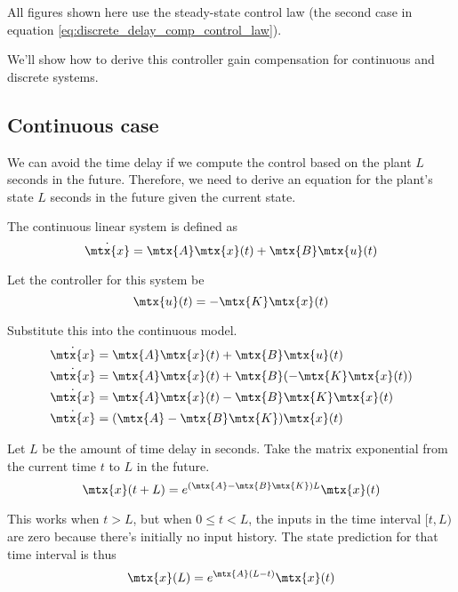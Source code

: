 All figures shown here use the steady-state control law (the second case in
equation \eqref{eq:discrete_delay_comp_control_law}).

We'll show how to derive this controller gain compensation for continuous and
discrete systems.

\subsection{Continuous case}

We can avoid the time delay if we compute the control based on the plant $L$
seconds in the future. Therefore, we need to derive an equation for the plant's
state $L$ seconds in the future given the current state.

The continuous linear system is defined as
\begin{equation*}
  \dot{\mtx{x}} = \mtx{A}\mtx{x}(t) + \mtx{B}\mtx{u}(t)
\end{equation*}

Let the controller for this system be
\begin{equation*}
  \mtx{u}(t) = -\mtx{K}\mtx{x}(t)
\end{equation*}

Substitute this into the continuous model.
\begin{align*}
  \dot{\mtx{x}} &= \mtx{A}\mtx{x}(t) + \mtx{B}\mtx{u}(t) \\
  \dot{\mtx{x}} &= \mtx{A}\mtx{x}(t) + \mtx{B}(-\mtx{K}\mtx{x}(t)) \\
  \dot{\mtx{x}} &= \mtx{A}\mtx{x}(t) - \mtx{B}\mtx{K}\mtx{x}(t) \\
  \dot{\mtx{x}} &= (\mtx{A} - \mtx{B}\mtx{K}) \mtx{x}(t)
\end{align*}

Let $L$ be the amount of time delay in seconds. Take the matrix exponential from
the current time $t$ to $L$ in the future.
\begin{equation}
  \mtx{x}(t + L) = e^{(\mtx{A} - \mtx{B}\mtx{K})L} \mtx{x}(t)
    \label{eq:continuous_advance_state_by_delay_post}
\end{equation}

This works when $t > L$, but when $0 \leq t < L$, the inputs in the time
interval $[t, L)$ are zero because there's initially no input history. The state
prediction for that time interval is thus
\begin{equation*}
  \mtx{x}(L) = e^{\mtx{A}(L - t)} \mtx{x}(t)
\end{equation*}

